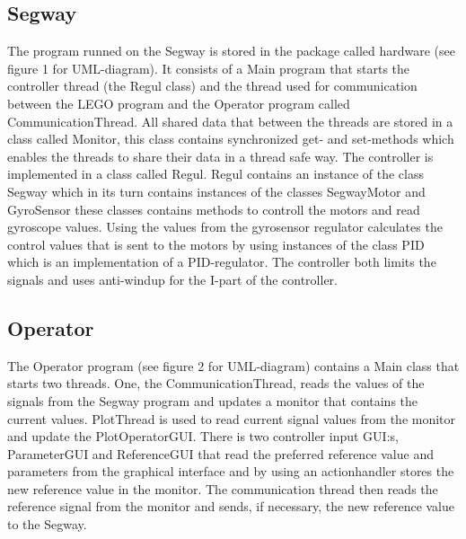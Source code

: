 \subsection{Segway}
The program runned on the Segway is stored in the package called hardware (see figure 1 for UML-diagram). It consists of a Main program that starts the controller thread (the Regul class) and the thread used for communication between the LEGO program and the Operator program called CommunicationThread. All shared data that between the threads are stored in a class called Monitor, this class contains synchronized get- and set-methods which enables the threads to share their data in a thread safe way. The controller is implemented in a class called Regul. Regul contains an instance of the class Segway which in its turn contains instances of the classes SegwayMotor and GyroSensor these classes contains methods to controll the motors and read gyroscope values. Using the values from the gyrosensor regulator calculates the control values that is sent to the motors by using instances of the class PID which is an implementation of a PID-regulator. The controller both limits the signals and uses anti-windup for the I-part of the controller. 


\subsection{Operator}
The Operator program (see figure 2 for UML-diagram)  contains a Main class that starts two threads. One, the CommunicationThread, reads the values of the signals from the Segway program and updates a monitor that contains the current values. PlotThread is used to read current signal values from the monitor and update the PlotOperatorGUI. There is two controller input GUI:s, ParameterGUI and ReferenceGUI that read the preferred reference value and parameters from the graphical interface and by using an actionhandler stores the new reference value in the monitor. The communication thread then reads the reference signal from the monitor and sends, if necessary, the new reference value to the Segway.


